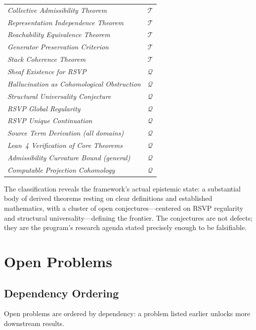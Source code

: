 \documentclass[12pt, oneside]{book}
\theoremstyle{flyxion}
\theoremstyle{definition}
\begin{document}
\begin{center}
\begin{tabular}{>{\itshape}lc}
Collective Admissibility Theorem & $\mathcal{T}$ \\
Representation Independence Theorem & $\mathcal{T}$ \\
Reachability Equivalence Theorem & $\mathcal{T}$ \\
Generator Preservation Criterion & $\mathcal{T}$ \\
Stack Coherence Theorem & $\mathcal{T}$ \\
\midrule
Sheaf Existence for RSVP & $\mathcal{Q}$ \\
Hallucination as Cohomological Obstruction & $\mathcal{Q}$ \\
Structural Universality Conjecture & $\mathcal{Q}$ \\
RSVP Global Regularity & $\mathcal{Q}$ \\
RSVP Unique Continuation & $\mathcal{Q}$ \\
Source Term Derivation (all domains) & $\mathcal{Q}$ \\
Lean~4 Verification of Core Theorems & $\mathcal{Q}$ \\
Admissibility Curvature Bound (general) & $\mathcal{Q}$ \\
Computable Projection Cohomology & $\mathcal{Q}$ \\
\bottomrule
\end{tabular}
\end{center}

The classification reveals the framework's actual
epistemic state: a substantial body of derived theorems
resting on clear definitions and established mathematics,
with a cluster of open conjectures---centered on RSVP
regularity and structural universality---defining the
frontier. The conjectures are not defects; they are
the program's research agenda stated precisely enough
to be falsifiable.

\chapter{Open Problems}

\section{Dependency Ordering}

Open problems are ordered by dependency: a problem
listed earlier unlocks more downstream results.
\end{document}
